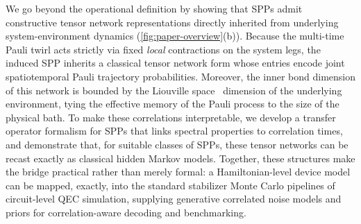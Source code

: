 \documentclass[
    aps,
    prx,
    reprint,
    superscriptaddress,
    longbibliography,
    nofootinbib,
    floatfix,
]{revtex4-2}
\begin{document}
We go beyond the operational definition by showing that SPPs admit constructive tensor network representations directly inherited from underlying system-environment dynamics (\cref{fig:paper-overview}(b)). Because the multi-time Pauli twirl acts strictly via fixed \emph{local} contractions on the system legs, the induced SPP inherits a classical tensor network form whose entries encode joint spatiotemporal Pauli trajectory probabilities. Moreover, the inner bond dimension of this network is bounded by the Liouville space~\cite{woodTensorNetworksGraphical2015} dimension of the underlying environment, tying the effective memory of the Pauli process to the size of the physical bath. To make these correlations interpretable, we develop a transfer operator formalism for SPPs that links spectral properties to correlation times, and demonstrate that, for suitable classes of SPPs, these tensor networks can be recast exactly as classical hidden Markov models. Together, these structures make the bridge practical rather than merely formal: a Hamiltonian-level device model can be mapped, exactly, into the standard stabilizer Monte Carlo pipelines of circuit-level QEC simulation, supplying generative correlated noise models and priors for correlation-aware decoding and benchmarking.
\end{document}
